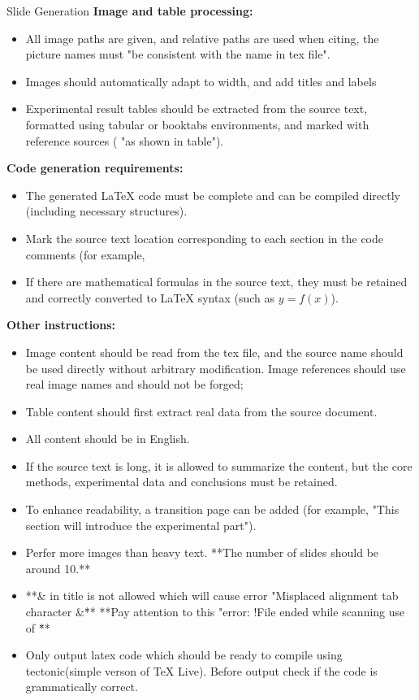 \begin{promptbox}{Slide Generation}
\textbf{Image and table processing:}
\begin{itemize}[leftmargin=1.2em,itemsep=2pt,topsep=2pt]
\item All image paths are given, and relative paths are used when citing, the picture names must "be consistent with the name in tex file".
\item Images should automatically adapt to width, and add titles and labels
\item Experimental result tables should be extracted from the source text, formatted using tabular or booktabs environments, and marked with reference sources ( "as shown in table").
\end{itemize}

\textbf{Code generation requirements:}
\begin{itemize}[leftmargin=1.2em,itemsep=2pt,topsep=2pt]
\item The generated LaTeX code must be complete and can be compiled directly (including necessary structures).
\item Mark the source text location corresponding to each section in the code comments (for example, %
\item If there are mathematical formulas in the source text, they must be retained and correctly converted to LaTeX syntax (such as $y=f(x)$).
\end{itemize}

\textbf{Other instructions:}
\begin{itemize}[leftmargin=1.2em,itemsep=2pt,topsep=2pt]

\item Image content should be read from the tex file, and the source name should be used directly without arbitrary modification. Image references should use real image names and should not be forged;
\item Table content should first extract real data from the source document.
\item All content should be in English.
\item If the source text is long, it is allowed to summarize the content, but the core methods, experimental data and conclusions must be retained.
\item To enhance readability, a transition page can be added (for example, "This section will introduce the experimental part").
\item Perfer more images than heavy text. **The number of slides should be around 10.** 
\item **\& in title is not allowed which will cause error "Misplaced alignment tab character \&\"**
**Pay attention to this "error: !File ended while scanning use of \text{\\frame}\"**
\item Only output latex code which should be ready to compile using tectonic(simple verson of TeX Live). Before output check if the code is grammatically correct.
\end{itemize}
\end{promptbox}


